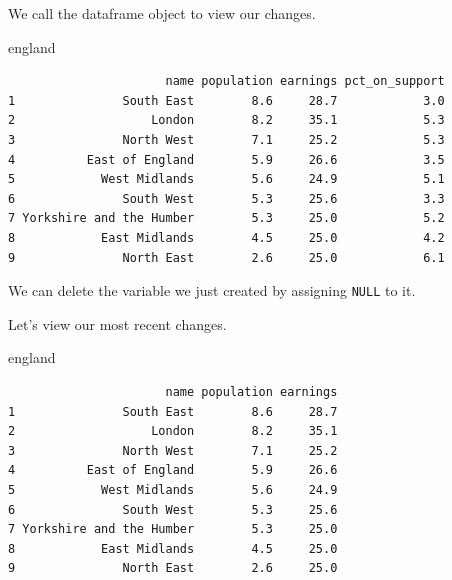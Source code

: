 \documentclass[]{article}
\newenvironment{Shaded}{\begin{snugshade}}{\end{snugshade}}
\newcommand{\NormalTok}[1]{#1}
\newcommand{\OperatorTok}[1]{\textcolor[rgb]{0.81,0.36,0.00}{\textbf{#1}}}
\newcommand{\OtherTok}[1]{\textcolor[rgb]{0.56,0.35,0.01}{#1}}
\newcommand{\StringTok}[1]{\textcolor[rgb]{0.31,0.60,0.02}{#1}}
\begin{document}
We call the dataframe object to view our changes.

\begin{Shaded}
\begin{Highlighting}[]
\NormalTok{england}
\end{Highlighting}
\end{Shaded}

\begin{verbatim}
                      name population earnings pct_on_support
1               South East        8.6     28.7            3.0
2                   London        8.2     35.1            5.3
3               North West        7.1     25.2            5.3
4          East of England        5.9     26.6            3.5
5            West Midlands        5.6     24.9            5.1
6               South West        5.3     25.6            3.3
7 Yorkshire and the Humber        5.3     25.0            5.2
8            East Midlands        4.5     25.0            4.2
9               North East        2.6     25.0            6.1
\end{verbatim}

We can delete the variable we just created by assigning \texttt{NULL} to it.

\begin{Shaded}
\end{Shaded}

Let's view our most recent changes.

\begin{Shaded}
\begin{Highlighting}[]
\NormalTok{england}
\end{Highlighting}
\end{Shaded}

\begin{verbatim}
                      name population earnings
1               South East        8.6     28.7
2                   London        8.2     35.1
3               North West        7.1     25.2
4          East of England        5.9     26.6
5            West Midlands        5.6     24.9
6               South West        5.3     25.6
7 Yorkshire and the Humber        5.3     25.0
8            East Midlands        4.5     25.0
9               North East        2.6     25.0
\end{verbatim}
\end{document}
